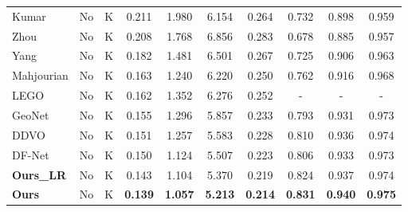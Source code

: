\documentclass[10pt,twocolumn,letterpaper]{article}
\begin{document}
\begin{table*}
\begin{center}
\begin{tabular}{l|c|c|c|c|c|c|c|c|c}
			\hline
			Kumar \etal \cite{kumar2018monocular}  & No & K & 0.211 & 1.980 & 6.154 & 0.264 & 0.732 & 0.898 & 0.959 \\
			Zhou \etal \cite{zhou2017unsupervised} & No & K & 0.208 & 1.768 & 6.856 & 0.283 & 0.678 & 0.885 & 0.957 \\ 
			Yang \etal \cite{yang2018unsupervised} & No & K & 0.182 & 1.481 & 6.501 & 0.267 & 0.725 & 0.906 & 0.963\\
			Mahjourian \etal \cite{mahjourian2018unsupervised} & No & K & 0.163 & 1.240 & 6.220 & 0.250 & 0.762 & 0.916 & 0.968\\
			LEGO \cite{LEGO} & No & K & 0.162 & 1.352 & 6.276 & 0.252 & - & - & -	\\	
			GeoNet \cite{yin2018geonet} & No & K & 0.155 & 1.296 & 5.857 & 0.233 & 0.793 & 0.931 & 0.973 \\	
			DDVO \cite{wang2018learning} & No & K & 0.151 & 1.257 & 5.583 & 0.228 & 0.810 & 0.936 & 0.974\\
			DF-Net \cite{zou2018df} & No & K & 0.150 & 1.124 & 5.507 & 0.223 & 0.806 & 0.933 & 0.973\\
			\textbf{Ours\_LR}     & No & K & 0.143 & 1.104 & 5.370 &  0.219 & 0.824 & 0.937 & 0.974 \\
			\textbf{Ours} & No & K & \textbf{0.139} & \textbf{1.057} & \textbf{5.213} &  \textbf{0.214} & \textbf{0.831} & \textbf{0.940} & \textbf{0.975} \\
			\hline \hline
			

\end{tabular}
\end{center}
\end{table*}
\end{document}
